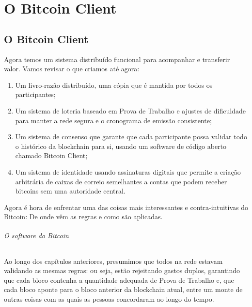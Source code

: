 \part{O Bitcoin Client}
\label{ch:capitulo8}
\chapter*{O Bitcoin Client}

Agora temos um sistema distribuído funcional para acompanhar e transferir valor. Vamos revisar o que criamos até agora:

\begin{samepage}
\begin{enumerate}
\item Um livro-razão distribuído, uma cópia que é mantida por todos os participantes;
\item Um sistema de loteria baseado em Prova de Trabalho e ajustes de dificuldade para manter a rede segura e o cronograma de emissão consistente;
\item Um sistema de consenso que garante que cada participante possa validar todo o histórico da blockchain para si, usando um software de código aberto chamado Bitcoin Client;
\item Um sistema de identidade usando assinaturas digitais que permite a criação arbitrária de caixas de correio semelhantes a contas que podem receber bitcoins sem uma autoridade central.
\end{enumerate}
\end{samepage}

Agora é hora de enfrentar uma das coisas mais interessantes e contra-intuitivas do Bitcoin: De onde vêm as regras e como são aplicadas.

\paragraph{O software do Bitcoin}
\paragraph{}

Ao longo dos capítulos anteriores, presumimos que todos na rede estavam validando as mesmas regras: ou seja, estão rejeitando gastos duplos, garantindo que cada bloco contenha a quantidade adequada de Prova de Trabalho e, que cada bloco aponte para o bloco anterior da blockchain atual, entre um monte de outras coisas com as quais as pessoas concordaram ao longo do tempo.

